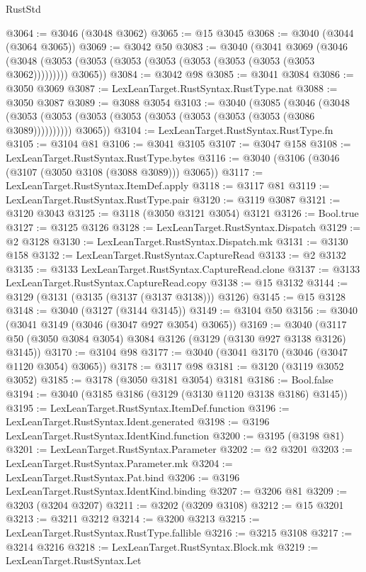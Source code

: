\begin{lexlean}{RustStd}
\begin{coremodule}
{\begin{coremodule}
{{{{{{{{{{{{{{{{{{{{{{{{{{{{{{{{{{{{{@3064 := @3046 (@3048 @3062)
@3065 := @15 @3045
@3068 := @3040 (@3044 (@3064 @3065))
@3069 := @3042 @50
@3083 := @3040
    (@3041
      @3069
      (@3046 (@3048 (@3053 (@3053 (@3053 (@3053 (@3053 (@3053 (@3053 (@3053 @3062))))))))) @3065))
@3084 := @3042 @98
@3085 := @3041 @3084
@3086 := @3050 @3069
@3087 := LexLeanTarget.RustSyntax.RustType.nat
@3088 := @3050 @3087
@3089 := @3088 @3054
@3103 := @3040
    (@3085
      (@3046
        (@3048 (@3053 (@3053 (@3053 (@3053 (@3053 (@3053 (@3053 (@3053 (@3086 @3089))))))))))
        @3065))
@3104 := LexLeanTarget.RustSyntax.RustType.fn
@3105 := @3104 @81
@3106 := @3041 @3105
@3107 := @3047 @158
@3108 := LexLeanTarget.RustSyntax.RustType.bytes
@3116 := @3040 (@3106 (@3046 (@3107 (@3050 @3108 (@3088 @3089))) @3065))
@3117 := LexLeanTarget.RustSyntax.ItemDef.apply
@3118 := @3117 @81
@3119 := LexLeanTarget.RustSyntax.RustType.pair
@3120 := @3119 @3087
@3121 := @3120 @3043
@3125 := @3118 (@3050 @3121 @3054) @3121
@3126 := Bool.true
@3127 := @3125 @3126
@3128 := LexLeanTarget.RustSyntax.Dispatch
@3129 := @2 @3128
@3130 := LexLeanTarget.RustSyntax.Dispatch.mk
@3131 := @3130 @158
@3132 := LexLeanTarget.RustSyntax.CaptureRead
@3133 := @2 @3132
@3135 := @3133 LexLeanTarget.RustSyntax.CaptureRead.clone
@3137 := @3133 LexLeanTarget.RustSyntax.CaptureRead.copy
@3138 := @15 @3132
@3144 := @3129 (@3131 (@3135 (@3137 (@3137 @3138))) @3126)
@3145 := @15 @3128
@3148 := @3040 (@3127 (@3144 @3145))
@3149 := @3104 @50
@3156 := @3040 (@3041 @3149 (@3046 (@3047 @927 @3054) @3065))
@3169 := @3040 (@3117 @50 (@3050 @3084 @3054) @3084 @3126 (@3129 (@3130 @927 @3138 @3126) @3145))
@3170 := @3104 @98
@3177 := @3040 (@3041 @3170 (@3046 (@3047 @1120 @3054) @3065))
@3178 := @3117 @98
@3181 := @3120 (@3119 @3052 @3052)
@3185 := @3178 (@3050 @3181 @3054) @3181
@3186 := Bool.false
@3194 := @3040 (@3185 @3186 (@3129 (@3130 @1120 @3138 @3186) @3145))
@3195 := LexLeanTarget.RustSyntax.ItemDef.function
@3196 := LexLeanTarget.RustSyntax.Ident.generated
@3198 := @3196 LexLeanTarget.RustSyntax.IdentKind.function
@3200 := @3195 (@3198 @81)
@3201 := LexLeanTarget.RustSyntax.Parameter
@3202 := @2 @3201
@3203 := LexLeanTarget.RustSyntax.Parameter.mk
@3204 := LexLeanTarget.RustSyntax.Pat.bind
@3206 := @3196 LexLeanTarget.RustSyntax.IdentKind.binding
@3207 := @3206 @81
@3209 := @3203 (@3204 @3207)
@3211 := @3202 (@3209 @3108)
@3212 := @15 @3201
@3213 := @3211 @3212
@3214 := @3200 @3213
@3215 := LexLeanTarget.RustSyntax.RustType.fallible
@3216 := @3215 @3108
@3217 := @3214 @3216
@3218 := LexLeanTarget.RustSyntax.Block.mk
@3219 := LexLeanTarget.RustSyntax.Let
}}}}}}}}}}}}}}}}}}}}}}}}}}}}}}}}}}}}}
\end{coremodule}}
\end{coremodule}
\end{lexlean}
